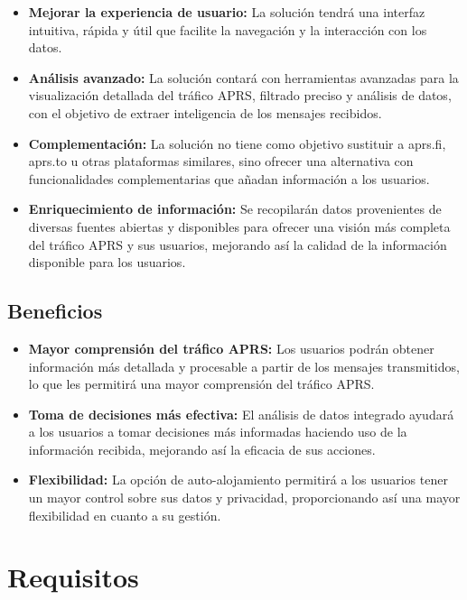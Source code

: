 \begin{itemize}
    \item \textbf{Mejorar la experiencia de usuario:} La solución tendrá una interfaz intuitiva, rápida y útil que facilite la navegación y la interacción con los datos.
    
    \item \textbf{Análisis avanzado:} La solución contará con herramientas avanzadas para la visualización detallada del tráfico APRS, filtrado preciso y análisis de datos, con el objetivo de extraer inteligencia de los mensajes recibidos.
    
    \item \textbf{Complementación:} La solución no tiene como objetivo sustituir a aprs.fi, aprs.to u otras plataformas similares, sino ofrecer una alternativa con funcionalidades complementarias que añadan información a los usuarios.
    
    \item \textbf{Enriquecimiento de información:} Se recopilarán datos provenientes de diversas fuentes abiertas y disponibles para ofrecer una visión más completa del tráfico APRS y sus usuarios, mejorando así la calidad de la información disponible para los usuarios.
\end{itemize}

\subsection{Beneficios}

\begin{itemize}
    \item \textbf{Mayor comprensión del tráfico APRS:} Los usuarios podrán obtener información más detallada y procesable a partir de los mensajes transmitidos, lo que les permitirá una mayor comprensión del tráfico APRS.
    
	\item \textbf{Toma de decisiones más efectiva:} El análisis de datos integrado ayudará a los usuarios a tomar decisiones más informadas haciendo uso de la información recibida, mejorando así la eficacia de sus acciones.
    
    \item \textbf{Flexibilidad:} La opción de auto-alojamiento permitirá a los usuarios tener un mayor control sobre sus datos y privacidad, proporcionando así una mayor flexibilidad en cuanto a su gestión.
\end{itemize}

\section{Requisitos}
\label{sec:Requisitos}


